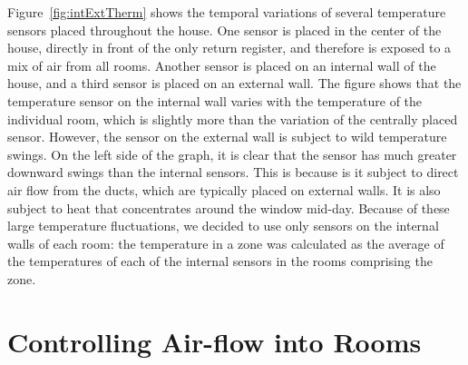 Figure~\ref{fig:intExtTherm} shows the temporal variations of several
temperature sensors placed throughout the house.  One sensor is placed
in the center of the house, directly in front of the only return
register, and therefore is exposed to a mix of air from all rooms.
Another sensor is placed on an internal wall of the house, and a third
sensor is placed on an external wall.  The figure shows that the
temperature sensor on the internal wall varies with the temperature of
the individual room, which is slightly more than the variation of the
centrally placed sensor.  However, the sensor on the external wall is
subject to wild temperature swings.  On the left side of the graph, it
is clear that the sensor has much greater downward swings than the
internal sensors.  This is because is it subject to direct air flow
from the ducts, which are typically placed on external walls.  It is
also subject to heat that concentrates around the window mid-day.
Because of these large temperature fluctuations, we decided to use
only sensors on the internal walls of each room: the temperature in a
zone was calculated as the average of the temperatures of each of the
internal sensors in the rooms comprising the zone.

\section{Controlling Air-flow into Rooms}
\label{sec:activeRegisters}

\begin{figure}[t]
\end{figure}

